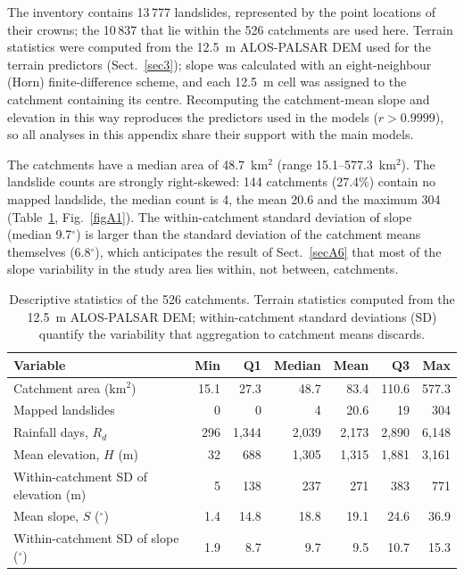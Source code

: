\documentclass[journal abbreviation, manuscript]{copernicus}
\begin{document}
The inventory contains 13\,777 landslides, represented by the point locations of their crowns; the 10\,837 that lie within the 526 catchments are used here. Terrain statistics were computed from the 12.5~m ALOS-PALSAR DEM used for the terrain predictors (Sect.~\ref{sec3}); slope was calculated with an eight-neighbour (Horn) finite-difference scheme, and each 12.5~m cell was assigned to the catchment containing its centre. Recomputing the catchment-mean slope and elevation in this way reproduces the predictors used in the models ($r > 0.9999$), so all analyses in this appendix share their support with the main models.

The catchments have a median area of 48.7~km$^2$ (range 15.1--577.3~km$^2$). The landslide counts are strongly right-skewed: 144 catchments (27.4\%) contain no mapped landslide, the median count is 4, the mean 20.6 and the maximum 304 (Table~\ref{tabA1}, Fig.~\ref{figA1}). The within-catchment standard deviation of slope (median 9.7$^{\circ}$) is larger than the standard deviation of the catchment means themselves (6.8$^{\circ}$), which anticipates the result of Sect.~\ref{secA6} that most of the slope variability in the study area lies within, not between, catchments.

\begin{table}[h]
\caption{Descriptive statistics of the 526 catchments. Terrain statistics computed from the 12.5~m ALOS-PALSAR DEM; within-catchment standard deviations (SD) quantify the variability that aggregation to catchment means discards.}\label{tabA1}
\footnotesize
\begin{tabular}{@{}lrrrrrr@{}}
\toprule
Variable & Min & Q1 & Median & Mean & Q3 & Max \\
\midrule
Catchment area (km$^2$) & 15.1 & 27.3 & 48.7 & 83.4 & 110.6 & 577.3 \\
Mapped landslides & 0 & 0 & 4 & 20.6 & 19 & 304 \\
Rainfall days, $R_d$ & 296 & 1,344 & 2,039 & 2,173 & 2,890 & 6,148 \\
Mean elevation, $H$ (m) & 32 & 688 & 1,305 & 1,315 & 1,881 & 3,161 \\
Within-catchment SD of elevation (m) & 5 & 138 & 237 & 271 & 383 & 771 \\
Mean slope, $S$ ($^{\circ}$) & 1.4 & 14.8 & 18.8 & 19.1 & 24.6 & 36.9 \\
Within-catchment SD of slope ($^{\circ}$) & 1.9 & 8.7 & 9.7 & 9.5 & 10.7 & 15.3 \\
\bottomrule
\end{tabular}
\end{table}
\end{document}
